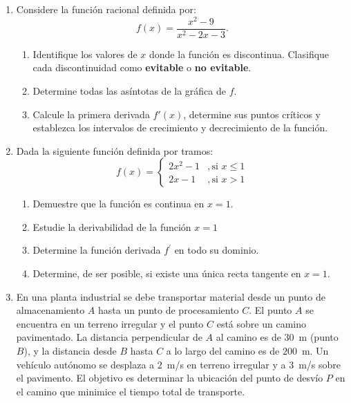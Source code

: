 \documentclass[11pt,letterpaper,hidelinks]{article}
\begin{document}
\begin{enumerate}[label={\bf P.\arabic*}]
    \item Considere la función racional definida por:
    \[ f(x) = \frac{x^2 - 9}{x^2 - 2x - 3}. \]
    \begin{enumerate}
        \item Identifique los valores de $x$ donde la función es discontinua. Clasifique cada discontinuidad como \textbf{evitable} o \textbf{no evitable}.
        \item Determine todas las asíntotas de la gráfica de $f$.
        \item Calcule la primera derivada $f'(x)$, determine sus puntos críticos y establezca los intervalos de crecimiento y decrecimiento de la función.
    \end{enumerate}


    \item Dada la siguiente función definida por tramos:
    \[ f(x) = \begin{cases} 2x^2 - 1 & ,\text{si } x \leq 1 \\ 2x - 1 & ,\text{si } x > 1 \end{cases} \]
    \begin{enumerate}
        \item Demuestre que la función es continua en $x = 1$.
        \item Estudie la derivabilidad de la función $x = 1$
        \item Determine la función derivada $f^{\prime}$ en todo su dominio.
        \item Determine, de ser posible, si existe una única recta tangente en $x = 1$.
    \end{enumerate}


    \item En una planta industrial se debe transportar material desde un punto de   almacenamiento $A$ hasta un punto de procesamiento $C$. El punto $A$ se encuentra en un terreno irregular y el punto $C$ está sobre un camino pavimentado. La distancia perpendicular de $A$ al camino es de $30$~m (punto $B$), y la distancia desde $B$ hasta $C$ a lo largo del camino es de $200$~m. Un vehículo autónomo se desplaza a $2$~m/s en terreno irregular y a $3$~m/s sobre el pavimento. El objetivo es determinar la ubicación del punto de desvío $P$ en el camino que minimice el tiempo total de transporte.

    \begin{center}
\end{center}
\end{enumerate}
\end{document}
